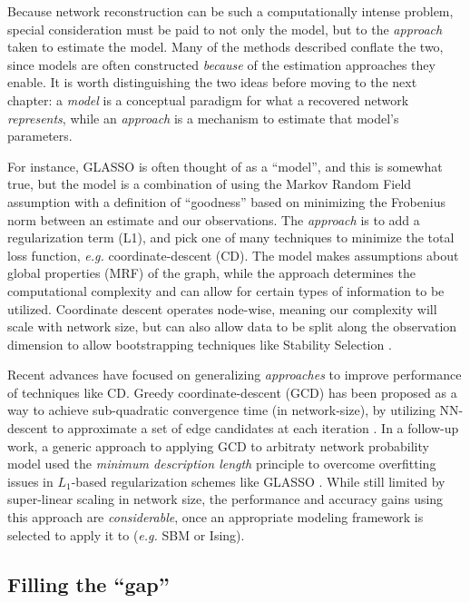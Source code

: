 \documentclass[%
	12pt,
		oneside,
		letterpaper
]{book}
\begin{document}
Because network reconstruction can be such a computationally intense problem, special consideration must be paid to not only the model, but to the \emph{approach} taken to estimate the model.
Many of the methods described conflate the two, since models are often constructed \emph{because} of the estimation approaches they enable.
It is worth distinguishing the two ideas before moving to the next chapter: a \emph{model} is a conceptual paradigm for what a recovered network \emph{represents}, while an \emph{approach} is a mechanism to estimate that model's parameters.

For instance, GLASSO is often thought of as a ``model'', and this is somewhat true, but the model is a combination of using the Markov Random Field assumption with a definition of ``goodness'' based on minimizing the Frobenius norm between an estimate and our observations.
The \emph{approach} is to add a regularization term (L1), and pick one of many techniques to minimize the total loss function, \emph{e.g.} coordinate-descent (CD).
The model makes assumptions about global properties (MRF) of the graph, while the approach determines the computational complexity and can allow for certain types of information to be utilized.
Coordinate descent operates node-wise, meaning our complexity will scale with network size, but can also allow data to be split along the observation dimension to allow bootstrapping techniques like Stability Selection \autocite{StabilitySelection_Meinshausen2010}.

Recent advances have focused on generalizing \emph{approaches} to improve performance of techniques like CD.
Greedy coordinate-descent (GCD) has been proposed as a way to achieve sub-quadratic convergence time (in network-size), by utilizing NN-descent to approximate a set of edge candidates at each iteration \autocite{Scalablenetworkreconstruction_Peixoto2024}.
In a follow-up work, a generic approach to applying GCD to arbitraty network probability model used the \emph{minimum description length} principle to overcome overfitting issues in \(L_1\)-based regularization schemes like GLASSO \autocite{Networkreconstructionvia_Peixoto2024}.
While still limited by super-linear scaling in network size, the performance and accuracy gains using this approach are \emph{considerable}, once an appropriate modeling framework is selected to apply it to (\emph{e.g.} SBM or Ising).

\subsection{Filling the ``gap''}\label{filling-the-gap}
\end{document}
